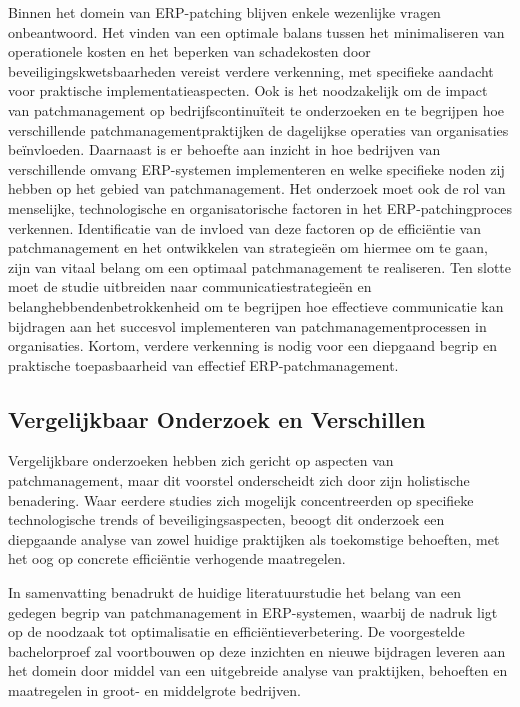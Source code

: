 Binnen het domein van ERP-patching blijven enkele wezenlijke vragen onbeantwoord. Het vinden van een optimale balans tussen het minimaliseren van operationele kosten en het beperken van schadekosten door beveiligingskwetsbaarheden vereist verdere verkenning, met specifieke aandacht voor praktische implementatieaspecten. Ook is het noodzakelijk om de impact van patchmanagement op bedrijfscontinuïteit te onderzoeken en te begrijpen hoe verschillende patchmanagementpraktijken de dagelijkse operaties van organisaties beïnvloeden. Daarnaast is er behoefte aan inzicht in hoe bedrijven van verschillende omvang ERP-systemen implementeren en welke specifieke noden zij hebben op het gebied van patchmanagement. Het onderzoek moet ook de rol van menselijke, technologische en organisatorische factoren in het ERP-patchingproces verkennen. Identificatie van de invloed van deze factoren op de efficiëntie van patchmanagement en het ontwikkelen van strategieën om hiermee om te gaan, zijn van vitaal belang om een optimaal patchmanagement te realiseren. Ten slotte moet de studie uitbreiden naar communicatiestrategieën en belanghebbendenbetrokkenheid om te begrijpen hoe effectieve communicatie kan bijdragen aan het succesvol implementeren van patchmanagementprocessen in organisaties. Kortom, verdere verkenning is nodig voor een diepgaand begrip en praktische toepasbaarheid van effectief ERP-patchmanagement.
\subsection{Vergelijkbaar Onderzoek en Verschillen}

Vergelijkbare onderzoeken hebben zich gericht op aspecten van patchmanagement, maar dit voorstel onderscheidt zich door zijn holistische benadering. Waar eerdere studies zich mogelijk concentreerden op specifieke technologische trends of beveiligingsaspecten, beoogt dit onderzoek een diepgaande analyse van zowel huidige praktijken als toekomstige behoeften, met het oog op concrete efficiëntie verhogende maatregelen.

In samenvatting benadrukt de huidige literatuurstudie het belang van een gedegen begrip van patchmanagement in ERP-systemen, waarbij de nadruk ligt op de noodzaak tot optimalisatie en efficiëntieverbetering. De voorgestelde bachelorproef zal voortbouwen op deze inzichten en nieuwe bijdragen leveren aan het domein door middel van een uitgebreide analyse van praktijken, behoeften en maatregelen in groot- en middelgrote bedrijven.

